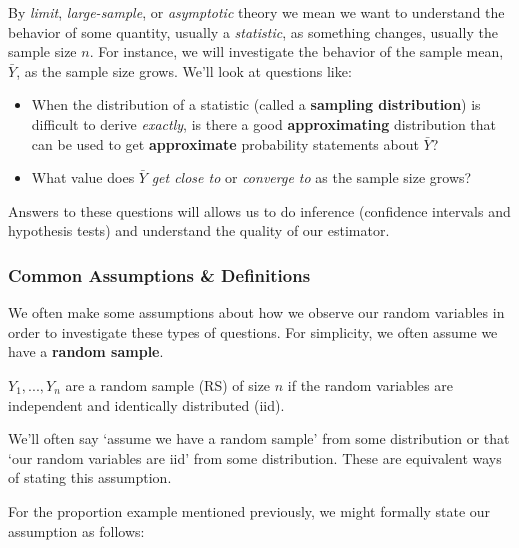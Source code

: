 \documentclass[
]{article}
\providecommand{\tightlist}{%
  \setlength{\itemsep}{0pt}\setlength{\parskip}{0pt}}
\begin{document}
By \emph{limit}, \emph{large-sample}, or \emph{asymptotic} theory we
mean we want to understand the behavior of some quantity, usually a
\emph{statistic}, as something changes, usually the sample size \(n\).
For instance, we will investigate the behavior of the sample mean,
\(\bar{Y}\), as the sample size grows. We'll look at questions like:

\begin{itemize}
\tightlist
\item
  When the distribution of a statistic (called a \textbf{sampling
  distribution}) is difficult to derive \emph{exactly}, is there a good
  \textbf{approximating} distribution that can be used to get
  \textbf{approximate} probability statements about \(\bar{Y}\)?
\item
  What value does \(\bar{Y}\) \emph{get close to} or \emph{converge to}
  as the sample size grows?
\end{itemize}

Answers to these questions will allows us to do inference (confidence
intervals and hypothesis tests) and understand the quality of our
estimator.

\hypertarget{common-assumptions-definitions}{%
\subsubsection{Common Assumptions \&
Definitions}\label{common-assumptions-definitions}}

We often make some assumptions about how we observe our random variables
in order to investigate these types of questions. For simplicity, we
often assume we have a \textbf{random sample}.

\begin{description}
\tightlist
\item[Random Sample]
\(Y_1,..., Y_n\) are a random sample (RS) of size \(n\) if the random
variables are independent and identically distributed (iid).
\end{description}

We'll often say `assume we have a random sample' from some distribution
or that `our random variables are iid' from some distribution. These are
equivalent ways of stating this assumption.

For the proportion example mentioned previously, we might formally state
our assumption as follows:
\end{document}
